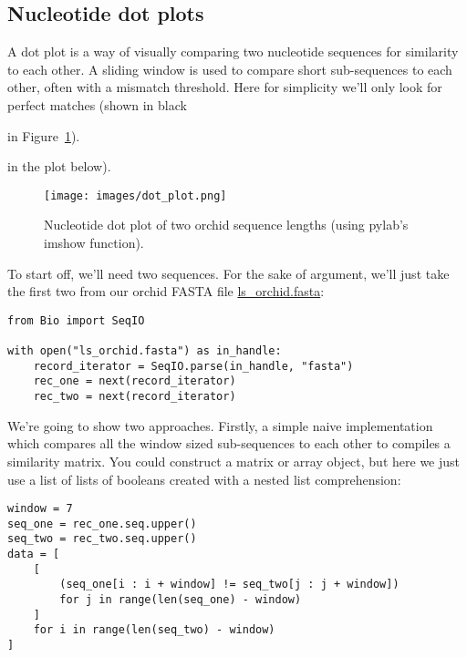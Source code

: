 \subsection{Nucleotide dot plots}
A dot plot is a way of visually comparing two nucleotide sequences for similarity to
each other.  A sliding window is used to compare short sub-sequences to each other,
often with a mismatch threshold.  Here for simplicity we'll only look for perfect
matches (shown in black
\begin{latexonly}
in Figure~\ref{fig:nuc-dot-plot}).
\end{latexonly}
\begin{htmlonly}
in the plot below).
\end{htmlonly}

%
%
\begin{latexonly}
\begin{figure}[htbp]
\centering
\texttt{[image: images/dot\_plot.png]}
\caption{Nucleotide dot plot of two orchid sequence lengths (using pylab's imshow function).}
\label{fig:nuc-dot-plot}
\end{figure}
\end{latexonly}

To start off, we'll need two sequences.  For the sake of argument, we'll just take
the first two from our orchid FASTA file \href{https://raw.githubusercontent.com/biopython/biopython/master/Doc/examples/ls_orchid.fasta}{ls\_orchid.fasta}:

\begin{verbatim}
from Bio import SeqIO

with open("ls_orchid.fasta") as in_handle:
    record_iterator = SeqIO.parse(in_handle, "fasta")
    rec_one = next(record_iterator)
    rec_two = next(record_iterator)
\end{verbatim}

We're going to show two approaches.  Firstly, a simple naive implementation
which compares all the window sized sub-sequences to each other to compiles a
similarity matrix.  You could construct a matrix or array object, but here we
just use a list of lists of booleans created with a nested list
comprehension:

\begin{verbatim}
window = 7
seq_one = rec_one.seq.upper()
seq_two = rec_two.seq.upper()
data = [
    [
        (seq_one[i : i + window] != seq_two[j : j + window])
        for j in range(len(seq_one) - window)
    ]
    for i in range(len(seq_two) - window)
]
\end{verbatim}

